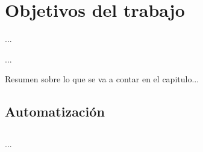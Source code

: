 %
%

\chapter{Objetivos del trabajo}

\begin{FraseCelebre}
\begin{Frase}
...
\end{Frase}
\begin{Fuente}
...
\end{Fuente}
\end{FraseCelebre}

\begin{resumen}
Resumen sobre lo que se va a contar en el capitulo...
\end{resumen}


\section{Automatizaci\'on}
\label{cap3:sec:objetivos}


\section*{\ProximoCapitulo}
\TocProximoCapitulo

...



